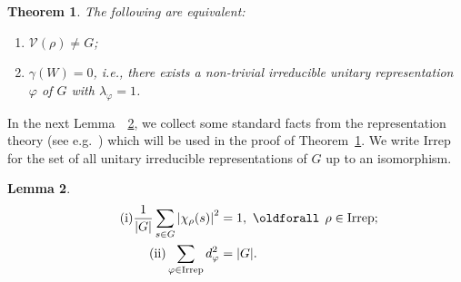 \documentclass[11pt]{article}
\newtheorem{theo}{Theorem}[section]
\newtheorem{lemm}[theo]{Lemma}
\theoremstyle{definition}
\numberwithin{equation}{section}
\numberwithin{figure}{section}
\numberwithin{table}{section}
\newcommand{\cV}{{\mathcal{V}}}
\newcommand\< {\mathcal{h}}
\renewcommand\> {\mathcal{i}}
\renewcommand*{\forall}{\mathrel{\oldforall}}
\newcommand*{\romanenumi}{\renewcommand*{\theenumi}{\roman{enumi}}}
\begin{document}
\begin{theo}\label{thmgap0}
The following are equivalent:
\begin{enumerate}\romanenumi
\item \label{list6.4.1}$\cV(\rho)\not=G$;
\item \label{list6.4.2}$\gamma(W) = 0$, i.e., there exists a non-trivial irreducible unitary representation $\varphi$ of $G$ with $\lambda_\varphi =1$.
\end{enumerate}
\end{theo}

In the next Lemma~~\ref{Useful properties}, we collect some standard facts from the representation theory (see e.g.~\cite[Chapter~2]{Diaconis}) which will be used in the proof of Theorem~\ref{thmgap0}. We write $\text{Irrep}$ for the set of all unitary irreducible representations of $G$ up to an isomorphism.

\begin{lemm}\label{Useful properties}
\begin{align}
\tag{i} \frac{1}{| G |}\sum_{s\in G} \left| \chi_\rho(s) \right|^2 &= 1,~\forall\,\rho \in \textup{Irrep};\label{list6.5.1}\\
\tag{ii} \sum_{\varphi\in \textup{Irrep}} d_\varphi^2 &= | G |\label{list6.5.2}.
\end{align}
\end{lemm}
\end{document}
